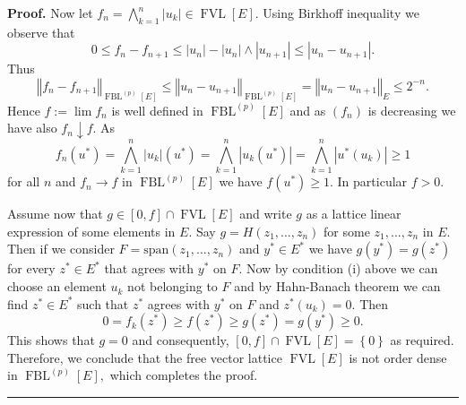 \documentclass[12pt]{article}%
\newenvironment{proof}[1][Proof]{\noindent\textbf{#1.} }{\ \rule{0.5em}{0.5em}}
\begin{document}
\begin{proof}
Now let $f_{n}=\bigwedge\limits_{k=1}^{n}\left\vert u_{k}\right\vert
\in\operatorname*{FVL}\left[  E\right]  .$ Using Birkhoff inequality we
observe that%
\[
0\leq f_{n}-f_{n+1}\leq\left\vert u_{n}\right\vert -\left\vert u_{n}%
\right\vert \wedge\left\vert u_{n+1}\right\vert \leq\left\vert u_{n}%
-u_{n+1}\right\vert .
\]
Thus%
\[
\left\Vert f_{n}-f_{n+1}\right\Vert _{\operatorname*{FBL}\nolimits^{\left(
p\right)  }\left[  E\right]  }\leq\left\Vert u_{n}-u_{n+1}\right\Vert
_{\operatorname*{FBL}\nolimits^{\left(  p\right)  }\left[  E\right]
}=\left\Vert u_{n}-u_{n+1}\right\Vert _{E}\leq2^{-n}.
\]
Hence $f:=\lim f_{n}$ is well defined in $\operatorname*{FBL}%
\nolimits^{\left(  p\right)  }\left[  E\right]  $ and as $\left(
f_{n}\right)  $ is decreasing we have also $f_{n}\downarrow f.$ As%
\[
f_{n}\left(  u^{\ast}\right)  =\bigwedge\limits_{k=1}^{n}\left\vert
u_{k}\right\vert \left(  u^{\ast}\right)  =\bigwedge\limits_{k=1}%
^{n}\left\vert u_{k}\left(  u^{\ast}\right)  \right\vert =\bigwedge
\limits_{k=1}^{n}\left\vert u^{\ast}\left(  u_{k}\right)  \right\vert \geq1
\]
for all $n$ and $f_{n}\longrightarrow f$ in $\operatorname*{FBL}%
\nolimits^{(p)}\left[  E\right]  $ we have $f\left(  u^{\ast}\right)  \geq1.$
In particular $f>0.$

Assume now that $g\in\left[  0,f\right]  \cap\operatorname*{FVL}\left[
E\right]  $ and write $g$ as a lattice linear expression of some elements in
$E.$ Say $g=H\left(  z_{1},...,z_{n}\right)  $ for some $z_{1},...,z_{n}$ in
$E.$ Then if we consider $F=\mathrm{span}\left(  z_{1},...,z_{n}\right)  $ and
$y^{\ast}\in E^{\ast}$ we have $g\left(  y^{\ast}\right)  =g\left(  z^{\ast
}\right)  $ for every $z^{\ast}\in E^{\ast}$ that agrees with $y^{\ast}$ on
$F.$ Now by condition (i) above we can choose an element $u_{k}$ not belonging
to $F$ and by Hahn-Banach theorem we can find $z^{\ast}\in E^{\ast}$ such that
$z^{\ast}$ agrees with $y^{\ast}$ on $F$ and $z^{\ast}\left(  u_{k}\right)
=0.$ Then%
\[
0=f_{k}\left(  z^{\ast}\right)  \geq f\left(  z^{\ast}\right)  \geq g\left(
z^{\ast}\right)  =g\left(  y^{\ast}\right)  \geq0.
\]
This shows that $g=0$ and consequently, $\left[  0,f\right]  \cap
\operatorname*{FVL}\left[  E\right]  =\left\{  0\right\}  $ as required.
Therefore, we conclude that the free vector lattice $\operatorname*{FVL}%
\left[  E\right]  $ is not order dense in $\operatorname*{FBL}\nolimits^{(p)}%
\left[  E\right]  ,$ which completes the proof.
\end{proof}
\end{document}
